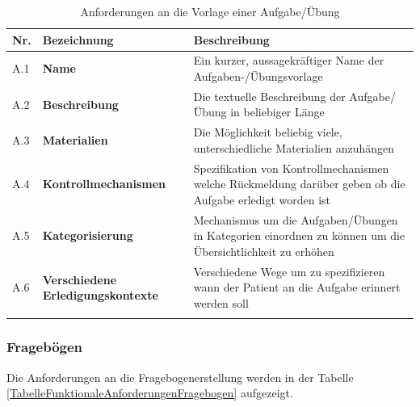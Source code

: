 \begin{table}[htbp]
	\begin{center}
		\begin{tabular}{p{} p{4cm} p{10cm}}
			\rowcolor{black!20} \textbf{Nr.} & \textbf{Bezeichnung} & \textbf{Beschreibung} \\ \toprule 
			A.1 & \textbf{Name} & Ein kurzer, aussagekräftiger Name der Aufgaben-/Übungsvorlage \\ \hline \addlinespace
			A.2 & \textbf{Beschreibung} & Die textuelle Beschreibung der Aufgabe/Übung in beliebiger Länge \\ \hline \addlinespace
			A.3 & \textbf{Materialien} & Die Möglichkeit beliebig viele, unterschiedliche Materialien anzuhängen \\ \hline \addlinespace
			A.4 & \textbf{Kontrollmechanismen} & Spezifikation von Kontrollmechanismen welche Rückmeldung darüber geben ob die Aufgabe erledigt worden ist \\ \hline \addlinespace
			A.5 & \textbf{Kategorisierung} & Mechanismus um die Aufgaben/Übungen in Kategorien einordnen zu können um die Übersichtlichkeit zu erhöhen  \\ \hline \addlinespace
			A.6 & \textbf{Verschiedene Erledigungskontexte} & Verschiedene Wege um zu spezifizieren wann der Patient an die Aufgabe erinnert werden soll \\ \hline \addlinespace
		\end{tabular}
	\end{center}
	\caption[Anforderungen an die Vorlage einer Aufgabe/Übung]{Anforderungen an die Vorlage einer Aufgabe/Übung}
	\label{TabelleFunktionaleAnforderungenAufgaben}
\end{table}

\subsubsection{Fragebögen}
Die Anforderungen an die Fragebogenerstellung werden in der Tabelle \ref{TabelleFunktionaleAnforderungenFragebogen} aufgezeigt.

